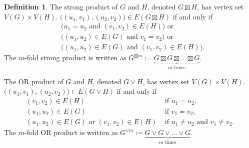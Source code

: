 \documentclass[journal, onecolumn, draftcls]{IEEEtran}
\theoremstyle{definition}
\newtheorem{definition}{Definition}
\begin{document}
\begin{definition}\label{defn:AND_product_OR_product}
     The strong product of $G$ and $H$, denoted $G\boxtimes H$, has vertex set $V(G)\times V(H)$. $\big( (u_1,v_1),(u_2,v_2) \big )\in E(G\boxtimes H)$ if and only if
    \begin{align*}
        & \big (u_1=u_2\text{ and }(v_1,v_2)\in E(H)\big )\text{ or}\\
        & \big ((u_1,u_2)\in E(G)\text{ and }v_1=v_2\big )\text{ or}\\
        & \big ((u_1,u_2)\in E(G)\text{ and }(v_1,v_2)\in E(H)\big ).
    \end{align*}
    The $m$-fold strong product is written as $G^{\boxtimes m} := \underbrace{G\boxtimes G\boxtimes \dots \boxtimes G}_{m\text{ times}}.$
    
\noindent The OR product of $G$ and $H$, denoted $G\lor H$, has vertex set $V(G)\times V(H)$. $\big((u_1,v_1),(u_2,v_2)\big)\in E(G\lor H)$ if and only if 
    \begin{align*} 
            (v_1,v_2)\in E(H)&\text{ if }u_1=u_2,\\
            (u_1,u_2)\in E(G)&\text{ if }v_1=v_2,\\
            (u_1,u_2)\in E(G) \text{ or }(v_1,v_2)\in E(H)&\text{ if }u_1\ne u_2\text{ and }v_1\ne v_2. 
    \end{align*}
    The $m$-fold OR product is written as $G^{\lor m} :=\underbrace{ G\lor G\lor \dots \lor G}_{m\text{ times}}.$
\end{definition}
\end{document}
